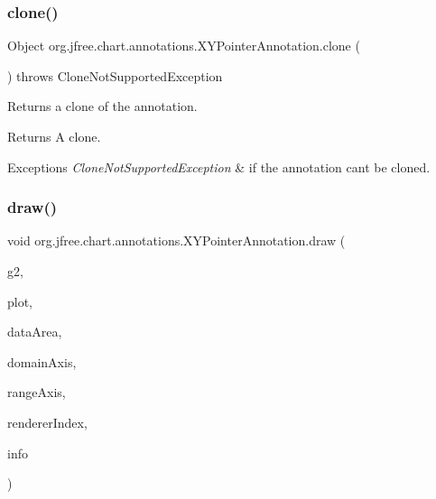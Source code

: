 \subsubsection{\texorpdfstring{clone()}{clone()}}
{\footnotesize\ttfamily Object org.\+jfree.\+chart.\+annotations.\+X\+Y\+Pointer\+Annotation.\+clone (\begin{DoxyParamCaption}{ }\end{DoxyParamCaption}) throws Clone\+Not\+Supported\+Exception}

Returns a clone of the annotation.

\begin{DoxyReturn}{Returns}
A clone.
\end{DoxyReturn}

\begin{DoxyExceptions}{Exceptions}
{\em Clone\+Not\+Supported\+Exception} & if the annotation can\textquotesingle{}t be cloned. \\
\hline
\end{DoxyExceptions}
\mbox{\label{classorg_1_1jfree_1_1chart_1_1annotations_1_1_x_y_pointer_annotation_a2ee7ce42e41d8d7d285232f675477531}} 
\subsubsection{\texorpdfstring{draw()}{draw()}}
{\footnotesize\ttfamily void org.\+jfree.\+chart.\+annotations.\+X\+Y\+Pointer\+Annotation.\+draw (\begin{DoxyParamCaption}\item[{Graphics2D}]{g2,  }\item[{\mbox{\hyperlink{classorg_1_1jfree_1_1chart_1_1plot_1_1_x_y_plot}{X\+Y\+Plot}}}]{plot,  }\item[{Rectangle2D}]{data\+Area,  }\item[{\mbox{\hyperlink{classorg_1_1jfree_1_1chart_1_1axis_1_1_value_axis}{Value\+Axis}}}]{domain\+Axis,  }\item[{\mbox{\hyperlink{classorg_1_1jfree_1_1chart_1_1axis_1_1_value_axis}{Value\+Axis}}}]{range\+Axis,  }\item[{int}]{renderer\+Index,  }\item[{\mbox{\hyperlink{classorg_1_1jfree_1_1chart_1_1plot_1_1_plot_rendering_info}{Plot\+Rendering\+Info}}}]{info }\end{DoxyParamCaption})}

